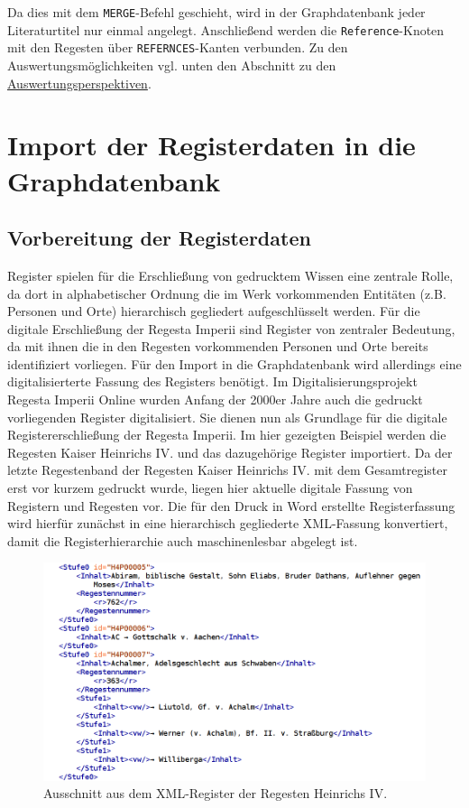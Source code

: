 \documentclass[ngerman,]{scrreprt}
\begin{document}
Da dies mit dem \texttt{MERGE}-Befehl geschieht, wird in der Graphdatenbank jeder Literaturtitel nur einmal angelegt. Anschließend werden die \texttt{Reference}-Knoten mit den Regesten über \texttt{REFERNCES}-Kanten verbunden. Zu den Auswertungsmöglichkeiten vgl. unten den Abschnitt zu den \protect\hyperlink{ux5cux23Auswertungsperspektiven}{Auswertungsperspektiven}.

\section{Import der Registerdaten in die Graphdatenbank}\label{import-der-registerdaten-in-die-graphdatenbank}

\subsection{Vorbereitung der Registerdaten}\label{vorbereitung-der-registerdaten}

Register spielen für die Erschließung von gedrucktem Wissen eine zentrale Rolle, da dort in alphabetischer Ordnung die im Werk vorkommenden Entitäten (z.B. Personen und Orte) hierarchisch gegliedert aufgeschlüsselt werden. Für die digitale Erschließung der Regesta Imperii sind Register von zentraler Bedeutung, da mit ihnen die in den Regesten vorkommenden Personen und Orte bereits identifiziert vorliegen. Für den Import in die Graphdatenbank wird allerdings eine digitalisierterte Fassung des Registers benötigt. Im Digitalisierungsprojekt Regesta Imperii Online wurden Anfang der 2000er Jahre auch die gedruckt vorliegenden Register digitalisiert. Sie dienen nun als Grundlage für die digitale Registererschließung der Regesta Imperii. Im hier gezeigten Beispiel werden die Regesten Kaiser Heinrichs IV. und das dazugehörige Register importiert. Da der letzte Regestenband der Regesten Kaiser Heinrichs IV. mit dem Gesamtregister erst vor kurzem gedruckt wurde, liegen hier aktuelle digitale Fassung von Registern und Regesten vor. Die für den Druck in Word erstellte Registerfassung wird hierfür zunächst in eine hierarchisch gegliederte XML-Fassung konvertiert, damit die Registerhierarchie auch maschinenlesbar abgelegt ist.

\begin{figure}
\centering
\includegraphics{Bilder/RI2Graph/XML-Register.png}
\caption{Ausschnitt aus dem XML-Register der Regesten Heinrichs IV.}
\end{figure}
\end{document}
